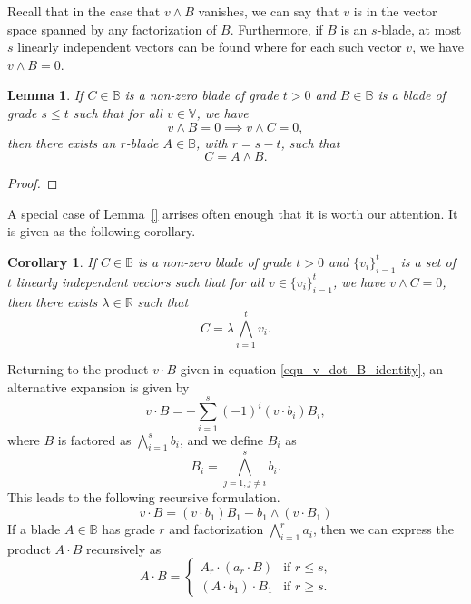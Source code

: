 \documentclass{birkjour}
\newtheorem{cor}[thm]{Corollary}
\newtheorem{lem}[thm]{Lemma}
\theoremstyle{definition}
\theoremstyle{remark}
\numberwithin{equation}{section}
\newcommand{\R}{\mathbb{R}}
\newcommand{\B}{\mathbb{B}}
\newcommand{\V}{\mathbb{V}}
\begin{document}
Recall that in the case that $v\wedge B$ vanishes, we can say that $v$ is
in the vector space spanned by any factorization of $B$.  Furthermore,
if $B$ is an $s$-blade, at most $s$ linearly independent vectors can be
found where for each such vector $v$, we have $v\wedge B=0$.

\begin{lem}
If $C\in\B$ is a non-zero blade of grade $t>0$ and $B\in\B$ is a blade
of grade $s\leq t$ such that for all $v\in\V$, we have
\begin{equation*}
v\wedge B=0\implies v\wedge C=0,
\end{equation*}
then there exists an $r$-blade $A\in\B$, with $r=s-t$, such that
\begin{equation*}
C = A\wedge B.
\end{equation*}
\end{lem}
\begin{proof}
\end{proof}

A special case of Lemma~\ref{} arrises often enough that it is worth our attention.
It is given as the following corollary.
\begin{cor}
If $C\in\B$ is a non-zero blade of grade $t>0$ and $\{v_i\}_{i=1}^t$ is a set
of $t$ linearly independent vectors such that for all $v\in\{v_i\}_{i=1}^t$,
we have $v\wedge C=0$, then there exists $\lambda\in\R$ such that
\begin{equation*}
C = \lambda\bigwedge_{i=1}^t v_i.
\end{equation*}
\end{cor}

Returning to the product $v\cdot B$ given in equation \eqref{equ_v_dot_B_identity},
an alternative expansion is given by
\begin{equation}\label{equ_v_dot_B_sum}
v\cdot B = -\sum_{i=1}^s (-1)^i(v\cdot b_i)B_i,
\end{equation}
where $B$ is factored as $\bigwedge_{i=1}^s b_i$, and we define $B_i$ as
\begin{equation*}
B_i = \bigwedge_{j=1,j\neq i}^s b_i.
\end{equation*}
This leads to the following recursive formulation.
\begin{equation*}
v\cdot B=(v\cdot b_1)B_1-b_1\wedge(v\cdot B_1)
\end{equation*}
If a blade $A\in\B$ has grade $r$ and factorization $\bigwedge_{i=1}^r a_i$, then
we can express the product $A\cdot B$ recursively as
\begin{equation*}
A\cdot B = \left\{\begin{array}{ll}
A_r\cdot (a_r\cdot B) & \mbox{if $r\leq s$,} \\
(A\cdot b_1)\cdot B_1 & \mbox{if $r\geq s$.}
\end{array}\right.
\end{equation*}
\end{document}
